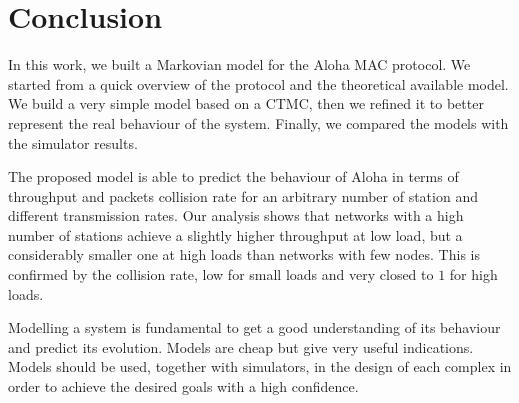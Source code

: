 \section{Conclusion}
\label{sec:conclusion}

In this work, we built a Markovian model for the Aloha \ac{MAC} protocol.
We started from a quick overview of the protocol and the theoretical available model.
We build a very simple model based on a \ac{CTMC}, then we refined it to better represent the real behaviour of the system.
Finally, we compared the models with the simulator results.

The proposed model is able to predict the behaviour of Aloha in terms of throughput and packets collision rate for an arbitrary number of station and different transmission rates.
Our analysis shows that networks with a high number of stations achieve a slightly higher throughput at low load, but a considerably smaller one at high loads than networks with few nodes.
This is confirmed by the collision rate, low for small loads and very closed to $1$ for high loads.

Modelling a system is fundamental to get a good understanding of its behaviour and predict its evolution.
Models are cheap but give very useful indications.
Models should be used, together with simulators, in the design of each complex in order to achieve the desired goals with a high confidence.
